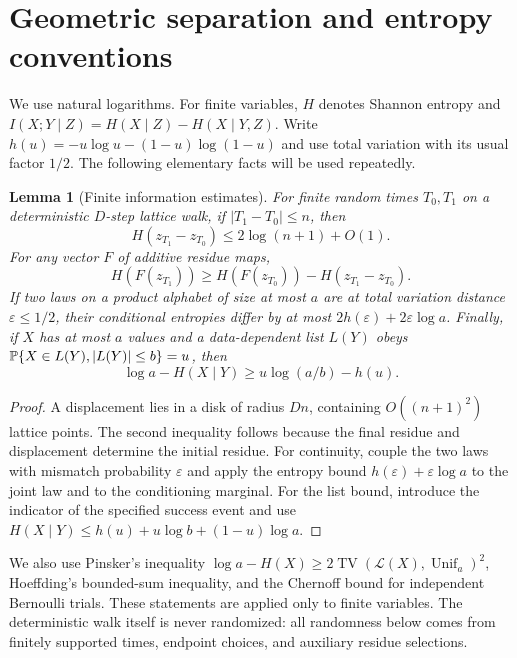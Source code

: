 \documentclass[11pt]{article}
\numberwithin{equation}{section}
\newtheorem{lemma}[theorem]{Lemma}
\theoremstyle{definition}\newtheorem{definition}[theorem]{Definition}
\theoremstyle{remark}\newtheorem{remark}[theorem]{Remark}
\newcommand{\abs}[1]{\lvert #1\rvert}
\newcommand{\TV}{\operatorname{TV}}
\begin{document}
\section{Geometric separation and entropy conventions}\label{sec:geometry}

We use natural logarithms. For finite variables, $H$ denotes Shannon entropy and
$I(X;Y\mid Z)=H(X\mid Z)-H(X\mid Y,Z)$. Write
$h(u)=-u\log u-(1-u)\log(1-u)$ and use total variation with its usual factor $1/2$.
The following elementary facts will be used repeatedly.

\begin{lemma}[Finite information estimates]\label{lem:info}
For finite random times $T_0,T_1$ on a deterministic $D$-step lattice walk, if $\abs{T_1-T_0}\le n$, then
\[
 H(z_{T_1}-z_{T_0})\le2\log(n+1)+O(1).
\]
For any vector $F$ of additive residue maps,
\[
 H(F(z_{T_1}))\ge H(F(z_{T_0}))-H(z_{T_1}-z_{T_0}).
\]
If two laws on a product alphabet of size at most $a$ are at total variation distance $\varepsilon\le1/2$, their conditional entropies differ by at most $2h(\varepsilon)+2\varepsilon\log a$.
Finally, if $X$ has at most $a$ values and a data-dependent list $L(Y)$ obeys
$\Prob\{X\in L(Y),\abs{L(Y)}\le b\}=u$, then
\[
 \log a-H(X\mid Y)\ge u\log(a/b)-h(u).
\]
\end{lemma}
\begin{proof}
A displacement lies in a disk of radius $Dn$, containing $O((n+1)^2)$ lattice points. The second inequality follows because the final residue and displacement determine the initial residue. For continuity, couple the two laws with mismatch probability $\varepsilon$ and apply the entropy bound $h(\varepsilon)+\varepsilon\log a$ to the joint law and to the conditioning marginal. For the list bound, introduce the indicator of the specified success event and use
$H(X\mid Y)\le h(u)+u\log b+(1-u)\log a$.
\end{proof}

We also use Pinsker's inequality
$\log a-H(X)\ge2\TV(\mathcal L(X),\operatorname{Unif}_a)^2$,
Hoeffding's bounded-sum inequality, and the Chernoff bound for independent Bernoulli trials. These statements are applied only to finite variables. The deterministic walk itself is never randomized: all randomness below comes from finitely supported times, endpoint choices, and auxiliary residue selections.
\end{document}
